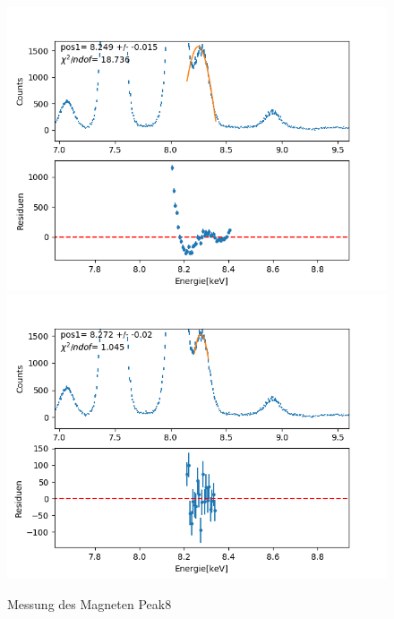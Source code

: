 \documentclass[12pt,a4paper]{article}
\begin{document}
\begin{figure}[H]
\centering
\includegraphics[scale=0.49]{Bilder/roentgen_spektren/magnet/mag8_1.png}
\includegraphics[scale=0.49]{Bilder/roentgen_spektren/magnet/mag8_2.png}
\caption{Messung des Magneten Peak8}
\end{figure}
\end{document}
